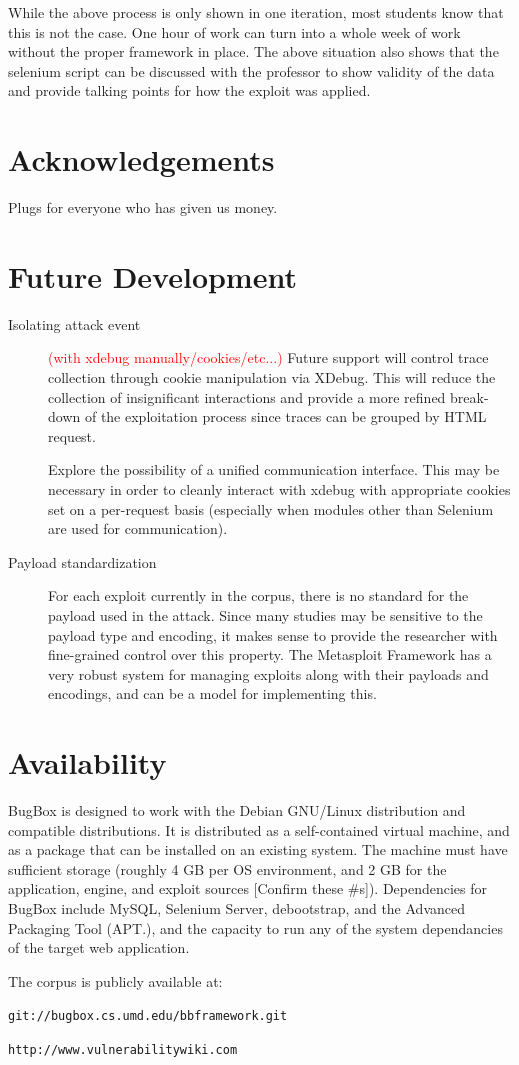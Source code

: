 \documentclass[letterpaper,twocolumn,10pt]{article}
\begin{document}
While the above process is only shown in one iteration, most students know that this is not the case.  One hour of work can turn into a whole week of work without the proper framework in place.  The above situation also shows that the selenium script can be discussed with the professor to show validity of the data and provide talking points for how the exploit was applied.


\section{Acknowledgements}

Plugs for everyone who has given us money.

\section{Future Development}
 \begin{description}
   \item[Isolating attack event]
     \textcolor{red}{(with xdebug manually/cookies/etc...)}   
  Future support will control trace collection through cookie manipulation via XDebug. This will reduce the collection of insignificant interactions and provide a more refined break-down of the exploitation process since traces can be grouped by HTML request.  \par
   Explore the possibility of a unified communication interface. This may be necessary in order to cleanly interact with xdebug with appropriate cookies set on a per-request basis (especially when modules other than Selenium are used for communication).
   \item[Payload standardization]
For each exploit currently in the corpus, there is no standard for the payload used in the attack. Since many studies may be sensitive to the payload type and encoding, it makes sense to provide the researcher with fine-grained control over this property. The Metasploit Framework has a very robust system for managing exploits along with their payloads and encodings, and can be a model for implementing this.
 \end{description}


\section{Availability}

BugBox is designed to work with the Debian GNU/Linux distribution and compatible distributions.  It is distributed as a self-contained virtual machine, and as a package that can be installed on an existing system. The machine must have sufficient storage (roughly 4 GB per OS environment, and 2 GB for the application, engine, and exploit sources [Confirm these \#s]).  Dependencies for BugBox include MySQL,  Selenium Server, debootstrap, and the Advanced Packaging Tool (APT.), and the capacity to run any of the system dependancies of the target web application.

The corpus is publicly available at:

\begin{center}
{\tt git://bugbox.cs.umd.edu/bbframework.git}
\end{center}

\begin{center}
{\tt http://www.vulnerabilitywiki.com}
\end{center}

{\footnotesize 
}
\end{document}
